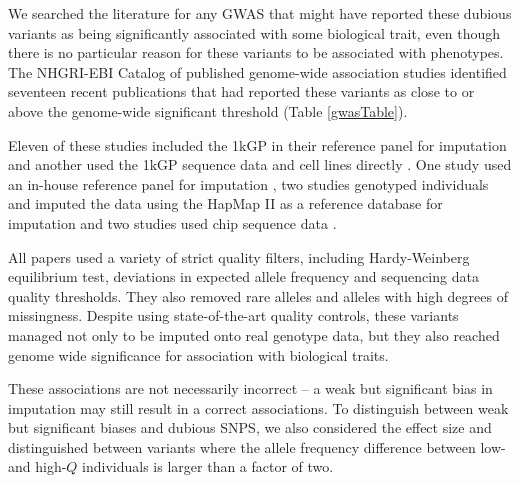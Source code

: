 \documentclass[custompaper]{MBE}%
\begin{document}
We searched the literature for any GWAS that might have reported these dubious variants as being significantly associated with some biological trait, even though there is no particular reason for these variants to be associated with phenotypes.
The NHGRI-EBI Catalog of published genome-wide association studies identified seventeen recent publications that had reported these variants as close to or above the genome-wide significant threshold (Table \ref{gwasTable}).

Eleven of these studies included the 1kGP in their reference panel for imputation \citep{xu2012genome, lutz2015genome, park2015mercapturic, astle2016allelic, herold2016family,  suhre2017connecting, lopez2017genome, tian2017genome,  spracklen2017association,  nagy2017exploration, gao2018genome} and another used the 1kGP sequence data and cell lines directly \citep{Mandage2017}.
One study used an in-house reference panel for imputation \citep{nishida2018key}, two studies genotyped individuals and imputed the data using the HapMap II as a reference  database for imputation \citep{Kraja2011, Ebejer2013} and two studies used chip sequence data \citep{yucesoy2015genome, ellinghaus2016analysis}.

All papers used a variety of strict quality filters, including Hardy-Weinberg equilibrium test, deviations in expected allele frequency and sequencing data quality thresholds.
They also removed rare alleles and alleles with high degrees of missingness.
Despite using state-of-the-art quality controls, these variants managed not only to be imputed onto real genotype data, but they also reached genome wide significance for association with biological traits.

These associations are not necessarily incorrect -- a weak but significant bias in imputation may still result in a correct associations. To distinguish between weak but significant biases and dubious SNPS, we also considered the effect size and distinguished between variants where the allele frequency difference between low- and high-$Q$ individuals is larger than a factor of two.
\end{document}

